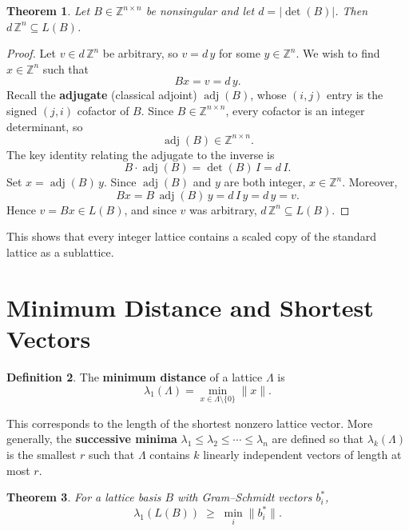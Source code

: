 \documentclass[11pt]{article}
\theoremstyle{plain}
\newtheorem{theorem}{Theorem}[section]
\theoremstyle{definition}
\newtheorem{definition}[theorem]{Definition}
\newcommand{\Z}{\mathbb{Z}}
\begin{document}
\begin{theorem}
Let $B \in \Z^{n \times n}$ be nonsingular and let $d = |\det(B)|$. Then $d\,\Z^n \subseteq L(B)$.
\end{theorem}

\begin{proof}
Let $v \in d\,\Z^n$ be arbitrary, so $v = d\,y$ for some $y \in \Z^n$. We wish to find $x \in \Z^n$ such that
\[
  Bx = v = d\,y.
\]
Recall the \textbf{adjugate} (classical adjoint) $\operatorname{adj}(B)$, whose $(i,j)$ entry is the signed $(j,i)$ cofactor of $B$. Since $B \in \Z^{n\times n}$, every cofactor is an integer determinant, so
\[
  \operatorname{adj}(B) \in \Z^{n \times n}.
\]
The key identity relating the adjugate to the inverse is
\[
  B \cdot \operatorname{adj}(B) = \det(B)\, I = d\, I.
\]
Set $x = \operatorname{adj}(B)\,y$. Since $\operatorname{adj}(B)$ and $y$ are both integer, $x \in \Z^n$. Moreover,
\[
  Bx = B\,\operatorname{adj}(B)\,y = d\,I\,y = d\,y = v.
\]
Hence $v = Bx \in L(B)$, and since $v$ was arbitrary, $d\,\Z^n \subseteq L(B)$.
\end{proof}

This shows that every integer lattice contains a scaled copy of the standard lattice as a sublattice.

\section{Minimum Distance and Shortest Vectors}

\begin{definition}
The \textbf{minimum distance} of a lattice $\Lambda$ is
\[
  \lambda_1(\Lambda) = \min_{x \in \Lambda \setminus \{0\}} \|x\|.
\]
\end{definition}

This corresponds to the length of the shortest nonzero lattice vector. More generally, the \textbf{successive minima} $\lambda_1 \le \lambda_2 \le \cdots \le \lambda_n$ are defined so that $\lambda_k(\Lambda)$ is the smallest $r$ such that $\Lambda$ contains $k$ linearly independent vectors of length at most $r$.

\begin{theorem}
For a lattice basis $B$ with Gram--Schmidt vectors $b_i^*$,
\[
  \lambda_1(L(B)) \;\ge\; \min_i \|b_i^*\|.
\]
\end{theorem}
\end{document}
